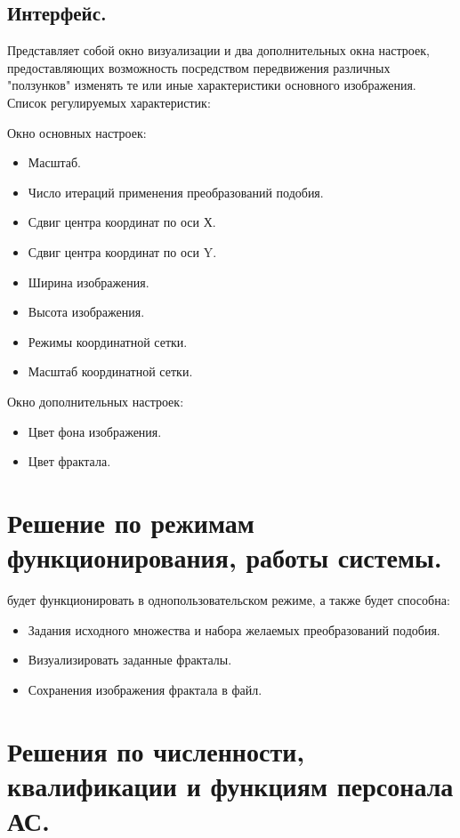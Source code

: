\documentclass[a4paper,12pt,preview]{report} %
\begin{document}
	\subsection{Интерфейс.}
	
	Представляет собой окно визуализации и два дополнительных окна настроек, предоставляющих возможность посредством передвижения различных "ползунков" изменять те или иные характеристики основного изображения. Список регулируемых характеристик:
	
	Окно основных настроек:
	
	\begin{itemize}
		\item Масштаб.
		\item Число итераций применения преобразований подобия.
		\item Сдвиг центра координат по оси Х.
		\item Сдвиг центра координат по оси Y.
		\item Ширина изображения.
		\item Высота изображения.
		\item Режимы координатной сетки.
		\item Масштаб координатной сетки.
	\end{itemize}
	
	Окно дополнительных настроек:
	
	\begin{itemize}
		\item Цвет фона изображения.
		\item Цвет фрактала.
	\end{itemize}
	
	
	
	\section{Решение по режимам функционирования, работы системы.}
	
	будет функционировать в однопользовательском режиме, а также будет способна:
	
	\begin{itemize}
		\item Задания исходного множества и набора желаемых преобразований подобия.
		\item Визуализировать заданные фракталы.
		\item Сохранения изображения фрактала в файл.
	\end{itemize}
	
	\section{Решения по численности, квалификации и функциям персонала АС.}
	
\end{document}
